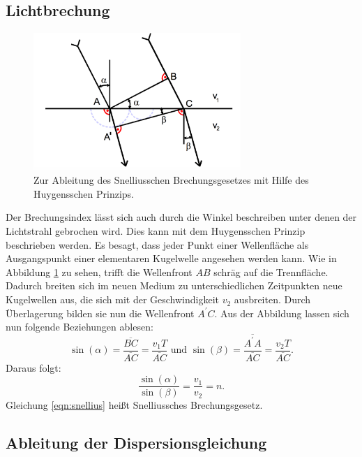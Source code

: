 \subsection{Lichtbrechung}

\begin{figure}
  \centering
  \includegraphics[width = 0.7\textwidth]{Pics/Snelius.pdf}
  \caption{Zur Ableitung des Snelliusschen Brechungsgesetzes mit Hilfe des Huygensschen Prinzips.}
  \label{fig:huygens}
\end{figure}

Der Brechungsindex lässt sich auch durch die Winkel beschreiben unter denen der Lichtstrahl
gebrochen wird. Dies kann mit dem Huygensschen Prinzip beschrieben werden. Es besagt, dass
jeder Punkt einer Wellenfläche als Ausgangspunkt einer elementaren Kugelwelle angesehen werden kann.
Wie in Abbildung \ref{fig:huygens} zu sehen, trifft die Wellenfront $AB$ schräg auf die Trennfläche.
Dadurch breiten sich im neuen Medium zu unterschiedlichen Zeitpunkten neue Kugelwellen aus, die sich
mit der Geschwindigkeit $v_2$ ausbreiten. Durch Überlagerung bilden sie nun
die Wellenfront $A^{'} C$. Aus der Abbildung lassen sich nun folgende Beziehungen ablesen:
\begin{equation*}
  \sin(\alpha) = \frac{\overline{B C}}{\overline{A C}} = \frac{v_1 T}{\overline{AC}} \text{~und~}
  \sin(\beta) = \frac{\overline{A^{'}A}}{\overline{A C}} = \frac{v_2 T}{\overline{A C}}.
\end{equation*}
Daraus folgt:
\begin{equation}
  \frac{\sin(\alpha)}{\sin(\beta)} = \frac{v_1}{v_2} = n.
  \label{eqn:snellius}
\end{equation}
Gleichung \eqref{eqn:snellius} heißt Snelliussches Brechungsgesetz.

\subsection{Ableitung der Dispersionsgleichung}

